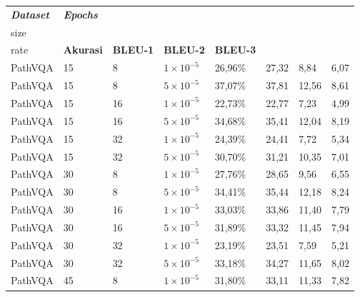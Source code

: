
\begin{longtable}[c]{|l|l|l|l|l|l|l|l|}
  \hline
  \textit{\textbf{Dataset}} &
    \textit{\textbf{Epochs}} &
    \textit{\textbf{\begin{tabular}[c]{@{}l@{}}Batch \\ size\end{tabular}}} &
    \textit{\textbf{\begin{tabular}[c]{@{}l@{}}Learning \\ rate\end{tabular}}} &
    \textbf{Akurasi} &
    \textbf{BLEU-1} &
    \textbf{BLEU-2} &
    \textbf{BLEU-3} \\ \hline
  \endfirsthead
  \endhead
  PathVQA & 15 & 8  & $1 \times 10^{-5}$ & 26,96\% & 27,32 & 8,84  & 6,07  \\ \hline
  PathVQA & 15 & 8  & $5 \times 10^{-5}$ & 37,07\% & 37,81 & 12,56 & 8,61  \\ \hline
  PathVQA & 15 & 16 & $1 \times 10^{-5}$ & 22,73\% & 22,77 & 7,23  & 4,99  \\ \hline
  PathVQA & 15 & 16 & $5 \times 10^{-5}$ & 34,68\% & 35,41 & 12,04 & 8,19  \\ \hline
  PathVQA & 15 & 32 & $1 \times 10^{-5}$ & 24,39\% & 24,41 & 7,72  & 5,34  \\ \hline
  PathVQA & 15 & 32 & $5 \times 10^{-5}$ & 30,70\% & 31,21 & 10,35 & 7,01  \\ \hline
  PathVQA & 30 & 8  & $1 \times 10^{-5}$ & 27,76\% & 28,65 & 9,56  & 6,55  \\ \hline
  PathVQA & 30 & 8  & $5 \times 10^{-5}$ & 34,41\% & 35,44 & 12,18 & 8,24  \\ \hline
  PathVQA & 30 & 16 & $1 \times 10^{-5}$ & 33,03\% & 33,86 & 11,40 & 7,79  \\ \hline
  PathVQA & 30 & 16 & $5 \times 10^{-5}$ & 31,89\% & 33,32 & 11,45 & 7,94  \\ \hline
  PathVQA & 30 & 32 & $1 \times 10^{-5}$ & 23,19\% & 23,51 & 7,59  & 5,21  \\ \hline
  PathVQA & 30 & 32 & $5 \times 10^{-5}$ & 33,18\% & 34,27 & 11,65 & 8,02  \\ \hline
  PathVQA & 45 & 8  & $1 \times 10^{-5}$ & 31,80\% & 33,11 & 11,33 & 7,82  \\ \hline

\end{longtable}
